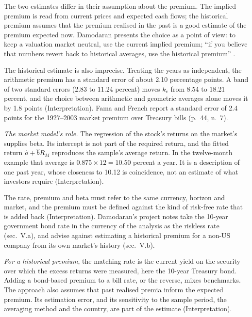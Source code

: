 \begin{qfmethod}
The two estimates differ in their assumption about the premium. The implied premium is read from current prices and expected cash flows; the historical premium assumes that the premium realised in the past is a good estimate of the premium expected now. Damodaran presents the choice as a point of view: to keep a valuation market neutral, use the current implied premium; ``if you believe that numbers revert back to historical averages, use the historical premium'' \citep[``Project Emails/Information'', sec.~V.b ``Risk Premiums'', read 2026-10-18]{corporate-finance-project-notes}.

The historical estimate is also imprecise. Treating the years as independent, the arithmetic premium has a standard error of about 2.10 percentage points. A band of two standard errors (2.83 to 11.24 percent) moves $k_e$ from 8.54 to 18.21 percent, and the choice between arithmetic and geometric averages alone moves it by 1.8 points (Interpretation). Fama and French report a standard error of 2.4 points for the 1927--2003 market premium over Treasury bills (p.~44, n.~7).

\emph{The market model's role.} The regression of the stock's returns on the market's supplies beta. Its intercept is not part of the required return, and the fitted return $\hat a+\hat bR_M$ reproduces the sample's average return. In the twelve-month example that average is $0.875\times12=10.50$ percent a year. It is a description of one past year, whose closeness to 10.12 is coincidence, not an estimate of what investors require (Interpretation).

 The rate, premium and beta must refer to the same currency, horizon and market, and the premium must be defined against the kind of risk-free rate that is added back (Interpretation). Damodaran's project notes take the 10-year government bond rate in the currency of the analysis as the riskless rate (sec.~V.a), and advise against estimating a historical premium for a non-US company from its own market's history (sec.~V.b).

\emph{For a historical premium}, the matching rate is the current yield on the security over which the excess returns were measured, here the 10-year Treasury bond. Adding a bond-based premium to a bill rate, or the reverse, mixes benchmarks. The approach also assumes that past realised premia inform the expected premium. Its estimation error, and its sensitivity to the sample period, the averaging method and the country, are part of the estimate (Interpretation).


\end{qfmethod}
